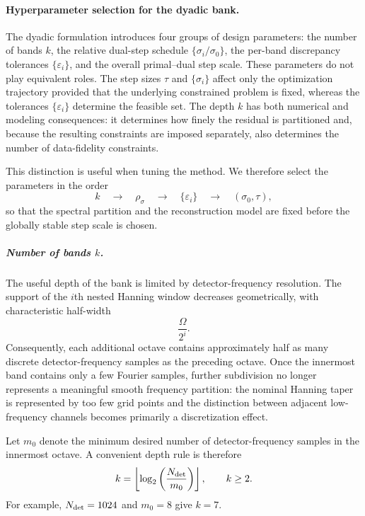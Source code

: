 \documentclass{article}
\begin{document}
\paragraph{Hyperparameter selection for the dyadic bank.}

The dyadic formulation introduces four groups of design parameters:
the number of bands $k$, the relative dual-step schedule
$\{\sigma_i/\sigma_0\}$, the per-band discrepancy tolerances
$\{\varepsilon_i\}$, and the overall primal--dual step scale.
These parameters do not play equivalent roles.  The step sizes
$\tau$ and $\{\sigma_i\}$ affect only the optimization trajectory
provided that the underlying constrained problem is fixed, whereas
the tolerances $\{\varepsilon_i\}$ determine the feasible set.
The depth $k$ has both numerical and modeling consequences: it
determines how finely the residual is partitioned and, because the
resulting constraints are imposed separately, also determines the
number of data-fidelity constraints.

This distinction is useful when tuning the method.  We therefore
select the parameters in the order
\[
k
\quad\longrightarrow\quad
\rho_\sigma
\quad\longrightarrow\quad
\{\varepsilon_i\}
\quad\longrightarrow\quad
(\sigma_0,\tau),
\]
so that the spectral partition and the reconstruction model are fixed
before the globally stable step scale is chosen.

\subparagraph{Number of bands $k$.}
The useful depth of the bank is limited by detector-frequency
resolution.  The support of the $i$th nested Hanning window decreases
geometrically, with characteristic half-width
\[
\frac{\Omega}{2^i}.
\]
Consequently, each additional octave contains approximately half as
many discrete detector-frequency samples as the preceding octave.
Once the innermost band contains only a few Fourier samples, further
subdivision no longer represents a meaningful smooth frequency
partition: the nominal Hanning taper is represented by too few grid
points and the distinction between adjacent low-frequency channels
becomes primarily a discretization effect.

Let $m_0$ denote the minimum desired number of detector-frequency
samples in the innermost octave.  A convenient depth rule is therefore
\begin{equation}
\label{eq:dyadic-k}
k
=
\left\lfloor
\log_2\left(\frac{N_{\rm det}}{m_0}\right)
\right\rfloor,
\qquad
k\ge2.
\end{equation}
For example, $N_{\rm det}=1024$ and $m_0=8$ give $k=7$.
\end{document}
